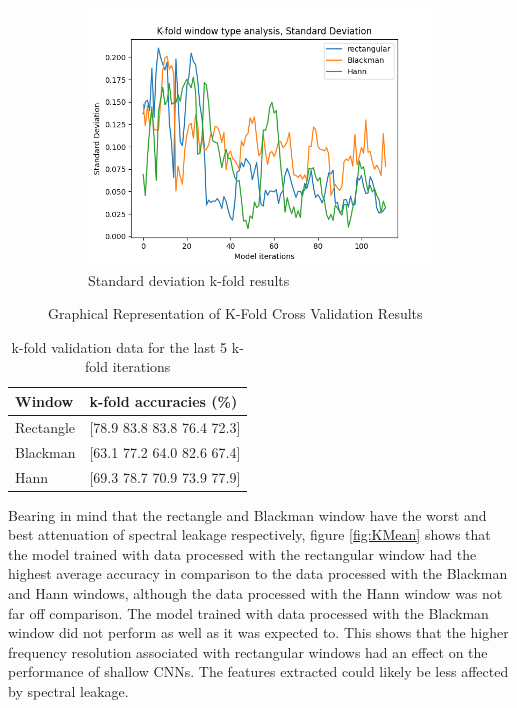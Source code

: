 \documentclass[class=report,11pt,crop=false]{standalone}
\begin{document}
\begin{figure}[ht]
\begin{subfigure}[b]{0.5\textwidth}
        \label{fig:KMin}
    \end{subfigure}
    \hfill
    \begin{subfigure}[b]{0.5\textwidth}
        \includegraphics[width=\linewidth]{Images/kfoldStandard Deviation.png}
        \caption{Standard deviation k-fold results}
        \label{fig:KStd}
    \end{subfigure}
    \caption{Graphical Representation of K-Fold Cross Validation Results}
    \label{fig:K-Fold}
\end{figure}

\begin{table}[h]
\centering
\begin{tabular}{|l|l|}
\hline
\textbf{Window} & \textbf{k-fold accuracies (\%)} \\
\hline
Rectangle & [78.9 83.8 83.8 76.4 72.3] \\
Blackman & [63.1 77.2 64.0 82.6 67.4] \\
Hann & [69.3 78.7 70.9 73.9 77.9] \\
\hline
\end{tabular}
\caption{k-fold validation data for the last 5 k-fold iterations}
\label{tab:k-fold-average}
\end{table}

Bearing in mind that the rectangle and Blackman window have the worst and best attenuation of spectral leakage respectively, figure \ref{fig:KMean} shows that the model trained with data processed with the rectangular window had the highest average accuracy in comparison to the data processed with the Blackman and Hann windows, although the data processed with the Hann window was not far off comparison. The model trained with data processed with the Blackman window did not perform as well as it was expected to. This shows that the higher frequency resolution associated with rectangular windows had an effect on the performance of shallow CNNs. The features extracted could likely be less affected by spectral leakage.
\end{document}

